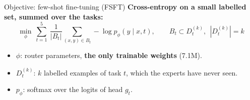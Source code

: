 \begin{frame}{Objective: few-shot fine-tuning (FSFT)}
  \textbf{Cross-entropy on a small labelled set, summed over the tasks:}
  \[
    \min_{\phi}\ \sum_{t=1}^{5}\ \frac{1}{|B_t|}\sum_{(x,y)\in B_t}-\log p_{\phi}(y\mid x,t),
    \qquad B_t\subset D_t^{(k)},\ \ |D_t^{(k)}|=k
  \]
  \begin{itemize}
    \item $\phi$: router parameters, \textbf{the only trainable weights} (7.1M).
    \item $D_t^{(k)}$: $k$ labelled examples of task $t$, which the experts have never seen.
    \item $p_{\phi}$: softmax over the logits of head $g_t$.
  \end{itemize}
  \vfill
  \centering
\end{frame}
